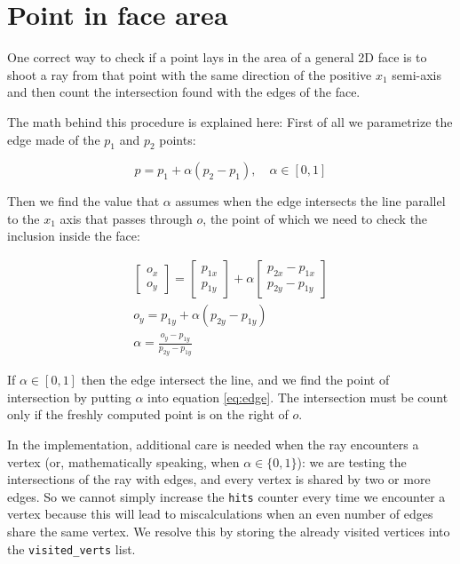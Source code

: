 \section{Point in face area}
\label{sec:point_in_face}

One correct way to check if a point lays in the area of a general 2D face
is to shoot a ray from that point with the same direction
of the positive $x_1$ semi-axis and then count the intersection found
with the edges of the face.

The math behind this procedure is explained here:
First of all we parametrize the edge made of the $p_1$ and $p_2$ points:

\begin{equation}
\label{eq:edge}
    p = p_1 + \alpha(p_2-p_1), \quad\alpha\in[0, 1]
\end{equation}

Then we find the value that $\alpha$ assumes when the edge
intersects the line parallel to the $x_1$ axis that passes through $o$,
the point of which we need to check the inclusion inside the face:

\begin{gather*}
    \begin{bmatrix}
        o_x \\ o_y
    \end{bmatrix}
    = 
    \begin{bmatrix}
        p_{1x} \\ p_{1y}
    \end{bmatrix}
    +
    \alpha
    \begin{bmatrix}
        p_{2x} - p_{1x} \\ p_{2y} - p_{1y}
    \end{bmatrix} \\
    o_y = p_{1y} + \alpha(p_{2y} - p_{1y}) \\
    \alpha = \frac{o_y - p_{1y}}{p_{2y} - p_{1y}}
\end{gather*}

If $\alpha\in[0, 1]$ then the edge intersect the line, and we find the point
of intersection by putting $\alpha$ into equation \ref{eq:edge}.
The intersection must be count only if the freshly computed point
is on the right of $o$.

In the implementation, additional care is needed when the ray encounters a vertex
(or, mathematically speaking, when $\alpha\in\{0, 1\}$):
we are testing the intersections of the ray with edges, and every
vertex is shared by two or more edges. So we cannot simply increase the 
\texttt{hits} counter every time we encounter a vertex because this will lead
to miscalculations when an even number of edges share the same vertex.
We resolve this by storing the already visited vertices into the 
\texttt{visited\_verts} list.

